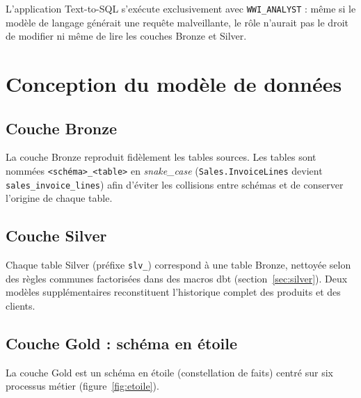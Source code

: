 L'application Text-to-SQL s'exécute exclusivement avec \texttt{WWI\_ANALYST} : même si le modèle de
langage générait une requête malveillante, le rôle n'aurait pas le droit de modifier ni même de lire les
couches Bronze et Silver.

\section{Conception du modèle de données}

\subsection{Couche Bronze}
La couche Bronze reproduit fidèlement les tables sources. Les tables sont nommées
\texttt{<schéma>\_<table>} en \emph{snake\_case} (\texttt{Sales.InvoiceLines} devient
\texttt{sales\_invoice\_lines}) afin d'éviter les collisions entre schémas et de conserver l'origine
de chaque table.

\subsection{Couche Silver}
Chaque table Silver (préfixe \texttt{slv\_}) correspond à une table Bronze, nettoyée selon des règles
communes factorisées dans des macros dbt (section~\ref{sec:silver}). Deux modèles supplémentaires
reconstituent l'historique complet des produits et des clients.

\subsection{Couche Gold : schéma en étoile}
La couche Gold est un schéma en étoile (constellation de faits) centré sur six processus métier
(figure~\ref{fig:etoile}).

